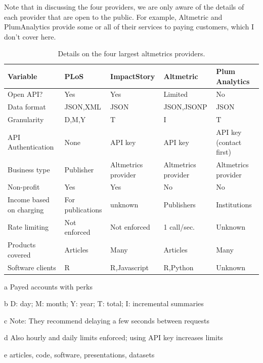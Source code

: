 \documentclass[letterpaper,superscriptaddress,showkeys,longbibliography]{revtex4-1}\usepackage{graphicx, color}
\begin{document}
Note that in discussing the four providers, we are only aware of the details of each provider that are open to the public. For example, Altmetric and PlumAnalytics provide some or all of their services to paying customers, which I don't cover here. 

\begin{table}[!ht]
    \begin{threeparttable}[b]
    \caption{Details on the four largest altmetrics providers.}\label{tab:a} %
        \begin{tabular}{|l|l|l|l|l|}
            \hline
            Variable & PLoS & ImpactStory & Altmetric & Plum Analytics \\
            \hline
            Open API? & Yes & Yes & Limited\tnote{d} & No \\
            Data format & JSON,XML & JSON & JSON,JSONP & JSON \\
            Granularity\tnote{b} & D,M,Y & T & I & T \\
            API Authentication & None & API key & API key & API key (contact first) \\
            Business type & Publisher & Altmetrics provider & Altmetrics provider & Altmetrics provider \\
            Non-profit & Yes & Yes & No & No \\
            Income based on charging & For publications & unknown & Publishers & Institutions \\
            Rate limiting & Not enforced & Not enforced\tnote{c} & 1 call/sec.\tnote{d} & Unknown \\
            Products covered & Articles & Many\tnote{e} & Articles & Many\tnote{f} \\
            Software clients & R\tnote{g} & R,Javascript\tnote{h} & R,Python\tnote{i} & Unknown \\
            \hline
        \end{tabular}
        \begin{tablenotes}
            \item[a] Payed accounts with perks
            \item[b] D: day; M: month; Y: year; T: total; I: incremental summaries
            \item[c] Note: They recommend delaying a few seconds between requests
            \item[d] Also hourly and daily limits enforced; using API key increases limits
            \item[e] articles, code, software, presentations, datasets

\end{tablenotes}
\end{threeparttable}
\end{table}
\end{document}
